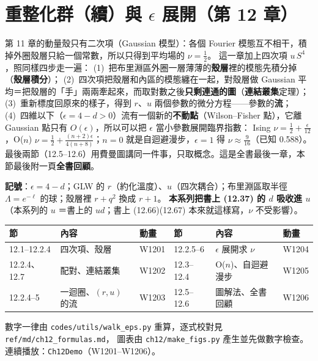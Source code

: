 

\section{\texorpdfstring{重整化群（續）與 $\epsilon$ 展開（第 12 章）}{重整化群（續）與 ε 展開（第 12 章）}}

\begin{keybox}[先看這裡]
第 11 章的動量殼只有二次項（Gaussian 模型）：各個 Fourier 模態互不相干，積掉外圈殼層只給一個常數，所以只得到平均場的 $\nu=\frac12$。
這一章加上四次項 $u\,S^4$，照同樣四步走一遍：
(1)~把布里淵區外圈一層薄薄的\textbf{殼層}裡的模態先積分掉（\textbf{殼層積分}）；
(2)~四次項把殼層和內區的模態纏在一起，對殼層做 Gaussian 平均＝把殼層的「手」兩兩牽起來，而取對數之後\textbf{只剩連通的圖}（\textbf{連結叢集}定理）；
(3)~重新標度回原來的樣子，得到 $r$、$u$ 兩個參數的微分方程——參數的\textbf{流}；
(4)~四維以下（$\epsilon=4-d>0$）流有一個新的\textbf{不動點}（Wilson--Fisher 點），它離 Gaussian 點只有 $O(\epsilon)$，所以可以把 $\epsilon$ 當小參數展開臨界指數：
Ising $\nu=\frac12+\frac\epsilon{12}$，O($n$) $\nu=\frac12+\frac{(n+2)\epsilon}{4(n+8)}$；$n=0$ 就是自迴避漫步，$\epsilon=1$ 得 $\nu\approx\frac9{16}$（已知 0.588）。
最後兩節（12.5--12.6）用費曼圖講同一件事，只取概念。這是全書最後一章，本節最後附一頁\textbf{全書回顧}。

\textbf{記號}：$\epsilon=4-d$；GLW 的 $r$（約化溫度）、$u$（四次耦合）；布里淵區取半徑 $\Lambda=e^{-\ell}$ 的球；殼層裡 $r+q^2$ 換成 $r+1$。
\textbf{本系列把書上 (12.37) 的 $d$ 吸收進 $u$}（本系列的 $u$ ＝書上的 $ud$；書上 (12.66)(12.67) 本來就這樣寫，$\nu$ 不受影響）。
\begin{center}
\small
\begin{tabular}{@{}lll@{\qquad}lll@{}}
\toprule
節 & 內容 & 動畫 & 節 & 內容 & 動畫\\
\midrule
12.1--12.2.4 & 四次項、殼層 & W1201 & 12.2.5--6 & $\epsilon$ 展開求 $\nu$ & W1204\\
12.2.4、12.7 & 配對、連結叢集 & W1202 & 12.3--12.4 & O($n$)、自迴避漫步 & W1205\\
12.2.4--5 & 一迴圈、$(r,u)$ 的流 & W1203 & 12.5--12.6 & 圖解法、全書回顧 & W1206\\
\bottomrule
\end{tabular}
\end{center}
數字一律由 \texttt{codes/utils/walk\_eps.py} 重算，逐式校對見 \texttt{ref/md/ch12\_formulas.md}，
圖表由 \texttt{ch12/make\_figs.py} 產生並先做數字檢查。連續播放：\texttt{Ch12Demo}（W1201--W1206）。
\end{keybox}

